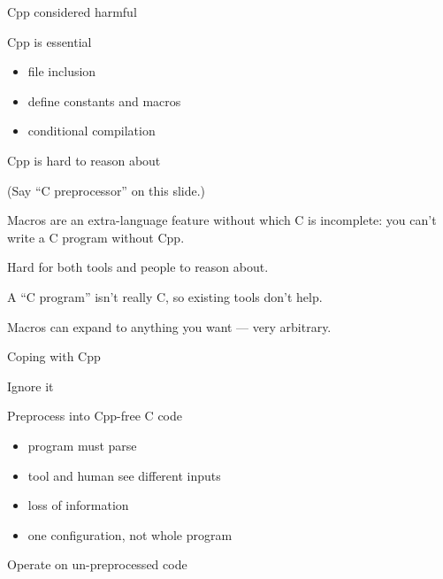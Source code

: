 \documentclass{slides}
\def\slidetitle#1{\begin{center}\large #1 \end{center}}
\def\slbreak{\\ \strut\hspace{1em}}
\begin{document}
\begin{slide}
\slidetitle{Cpp considered harmful}

Cpp is essential
\vspace{-.5in}
\begin{itemize}\itemsep 0pt \parskip 0pt
\item file inclusion
\item define constants and macros
\item conditional compilation
\end{itemize}

Cpp is hard to reason about
\end{slide}

\begin{note}
(Say ``C preprocessor'' on this slide.)

Macros are an extra-language feature without which C is incomplete: you
can't write a C program without Cpp.

Hard for both tools and people to reason about. \slbreak
A ``C program'' isn't really C, so existing tools don't help. \slbreak
Macros can expand to anything you want --- very arbitrary.
\end{note}

\begin{slide}
\slidetitle{Coping with Cpp}

Ignore it

Preprocess into Cpp-free C code
\vspace{-.5in}
\begin{itemize}\itemsep 0pt \parskip 0pt
\item program must parse
\item tool and human see different inputs
\item loss of information
\item one configuration, not whole program
\end{itemize}

Operate on un-preprocessed code
\end{slide}
\end{document}
